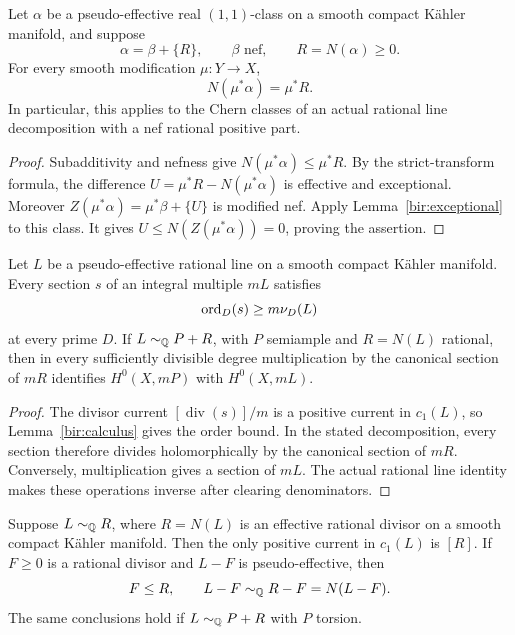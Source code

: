 \begin{lemma}\label{bir:pullup}
Let \(\alpha\) be a pseudo-effective real \((1,1)\)-class on a smooth compact
Kähler manifold, and suppose
\[
 \alpha=\beta+\{R\},\qquad \beta\text{ nef},\qquad R=N(\alpha)\geq0.
\]
For every smooth modification \(\mu:Y\to X\),
\[
 N(\mu^*\alpha)=\mu^*R.
\]
In particular, this applies to the Chern classes of an actual rational line
decomposition with a nef rational positive part.
\end{lemma}

\begin{proof}
Subadditivity and nefness give \(N(\mu^*\alpha)\leq\mu^*R\). By the
strict-transform formula, the difference
\(U=\mu^*R-N(\mu^*\alpha)\) is effective and exceptional. Moreover
\(Z(\mu^*\alpha)=\mu^*\beta+\{U\}\) is modified nef. Apply
Lemma~\ref{bir:exceptional} to this class. It gives
\(U\leq N(Z(\mu^*\alpha))=0\), proving the assertion.
\end{proof}

\begin{lemma}\label{bir:sections}
Let \(L\) be a pseudo-effective rational line on a smooth compact Kähler
manifold. Every section \(s\) of an integral multiple \(mL\) satisfies
\[
 \operatorname{ord}_D(s)\geq m\nu_D(L)
\]
at every prime \(D\). If \(L\sim_{\mathbb Q}P+R\), with \(P\) semiample and
\(R=N(L)\) rational, then in every sufficiently divisible degree
multiplication by the canonical section of \(mR\) identifies
\(H^0(X,mP)\) with \(H^0(X,mL)\).
\end{lemma}

\begin{proof}
The divisor current \([\operatorname{div}(s)]/m\) is a positive current
in \(c_1(L)\), so Lemma~\ref{bir:calculus} gives the order bound. In the
stated decomposition, every section therefore divides holomorphically by
the canonical section of \(mR\). Conversely, multiplication gives a
section of \(mL\). The actual rational line identity makes these operations
inverse after clearing denominators.
\end{proof}

\begin{lemma}
\label{bir:unique-current}
Suppose \(L\sim_{\mathbb Q}R\), where \(R=N(L)\) is an effective rational
divisor on a smooth compact Kähler manifold. Then the only positive current
in \(c_1(L)\) is \([R]\). If \(F\geq0\) is a rational divisor and
\(L-F\) is pseudo-effective, then
\[
 F\leq R,\qquad L-F\sim_{\mathbb Q}R-F=N(L-F).
\]
The same conclusions hold if \(L\sim_{\mathbb Q}P+R\) with \(P\) torsion.
\end{lemma}

